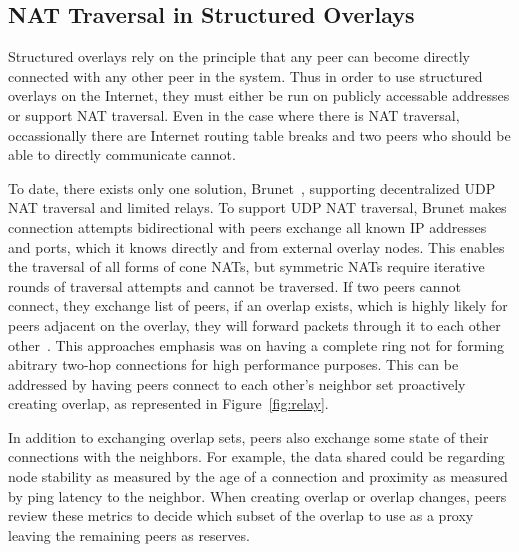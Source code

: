 \subsection{NAT Traversal in Structured Overlays}
Structured overlays rely on the principle that any peer can become directly
connected with any other peer in the system.  Thus in order to use structured
overlays on the Internet, they must either be run on publicly accessable
addresses or support NAT traversal.  Even in the case where there is NAT
traversal, occassionally there are Internet routing table breaks and two
peers who should be able to directly communicate cannot.

To date, there exists only one solution, Brunet~\cite{brunet}, supporting
decentralized UDP NAT traversal and limited relays.  To support UDP NAT
traversal, Brunet makes connection attempts bidirectional with peers exchange
all known IP addresses and ports, which it knows directly and from external
overlay nodes.  This enables the traversal of all forms of cone NATs, but
symmetric NATs require iterative rounds of traversal attempts and cannot be
traversed.  If two peers cannot connect, they exchange list of peers, if an
overlap exists, which is highly likely for peers adjacent on the overlay, they
will forward packets through it to each other other~\cite{hpdc08_1}.  This
approaches emphasis was on having a complete ring not for forming abitrary
two-hop connections for high performance purposes.  This can be addressed by
having peers connect to each other's neighbor set proactively creating overlap,
as represented in Figure~\ref{fig:relay}.

In addition to exchanging overlap sets, peers also exchange some state of their
connections with the neighbors.  For example, the data shared could be
regarding node stability as measured by the age of a connection and proximity
as measured by ping latency to the neighbor.  When creating overlap or overlap
changes, peers review these metrics to decide which subset of the overlap to
use as a proxy leaving the remaining peers as reserves.

